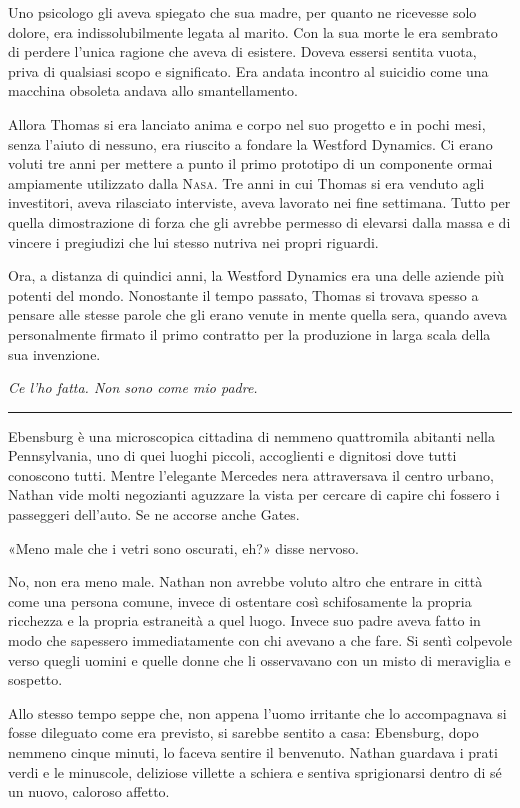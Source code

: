 \documentclass[a4paper,oneside,11pt]{memoir}
\begin{document}
Uno psicologo gli aveva spiegato che sua madre, per quanto ne ricevesse solo
dolore, era indissolubilmente legata al marito. Con la sua morte le era sembrato
di perdere l'unica ragione che aveva di esistere. Doveva essersi sentita vuota,
priva di qualsiasi scopo e significato. Era andata incontro al suicidio come una
macchina obsoleta andava allo smantellamento.

Allora Thomas si era lanciato anima e corpo nel suo progetto e in pochi mesi,
senza l'aiuto di nessuno, era riuscito a fondare la Westford Dynamics. Ci erano
voluti tre anni per mettere a punto il primo prototipo di un componente ormai
ampiamente utilizzato dalla {\scshape Nasa}. Tre anni in cui Thomas si era
venduto agli investitori, aveva rilasciato interviste, aveva lavorato nei fine
settimana. Tutto per quella dimostrazione di forza che gli avrebbe permesso di
elevarsi dalla massa e di vincere i pregiudizi che lui stesso nutriva nei propri
riguardi.

Ora, a distanza di quindici anni, la Westford Dynamics era una delle aziende più
potenti del mondo. Nonostante il tempo passato, Thomas si trovava spesso a
pensare alle stesse parole che gli erano venute in mente quella sera, quando
aveva personalmente firmato il primo contratto per la produzione in larga scala
della sua invenzione.

\emph{Ce l'ho fatta. Non sono come mio padre.}

\plainbreak{1}

Ebensburg è una microscopica cittadina di nemmeno quattromila abitanti nella
Pennsylvania, uno di quei luoghi piccoli, accoglienti e dignitosi dove tutti
conoscono tutti. Mentre l'elegante Mercedes nera attraversava il centro urbano,
Nathan vide molti negozianti aguzzare la vista per cercare di capire chi fossero
i passeggeri dell'auto. Se ne accorse anche Gates.

«Meno male che i vetri sono oscurati, eh?» disse nervoso.

No, non era meno male. Nathan non avrebbe voluto altro che entrare in città come
una persona comune, invece di ostentare così schifosamente la propria ricchezza
e la propria estraneità a quel luogo. Invece suo padre aveva fatto in modo che
sapessero immediatamente con chi avevano a che fare. Si sentì colpevole verso
quegli uomini e quelle donne che li osservavano con un misto di meraviglia e
sospetto.

Allo stesso tempo seppe che, non appena l'uomo irritante che lo accompagnava si
fosse dileguato come era previsto, si sarebbe sentito a casa: Ebensburg, dopo
nemmeno cinque minuti, lo faceva sentire il benvenuto. Nathan guardava i prati
verdi e le minuscole, deliziose villette a schiera e sentiva sprigionarsi dentro
di sé un nuovo, caloroso affetto.
\end{document}
